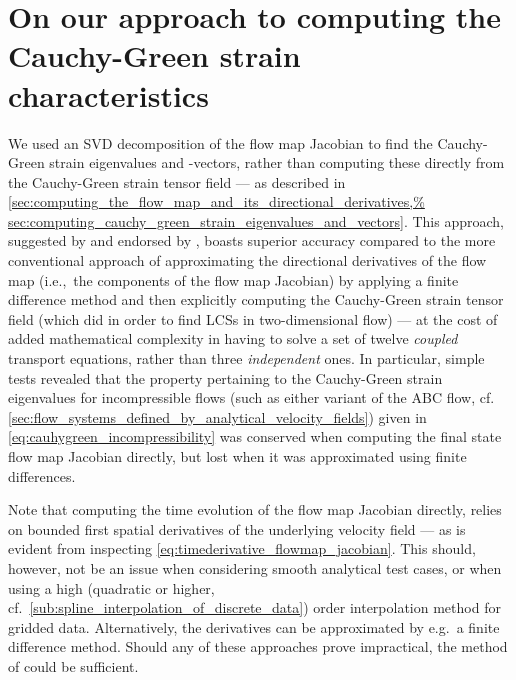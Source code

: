 \section[On our approach to computing the Cauchy-Green
strain characteristics] {On our approach to computing the%
    \\\phantom{5.1} Cauchy-Green strain characteristics}
\label{sec:on_our_approach_to_computing_the_cauchy_green%
_strain_characteristics}

We used an SVD decomposition of the flow map Jacobian to find the Cauchy-Green
strain eigenvalues and -vectors, rather than computing these directly from the
Cauchy-Green strain tensor field --- as described in
\cref{sec:computing_the_flow_map_and_its_directional_derivatives,%
sec:computing_cauchy_green_strain_eigenvalues_and_vectors}. This approach,
suggested by \textcite{miron2012anisotropic} and endorsed by
\textcite{oettinger2016autonomous}, boasts superior accuracy compared to the
more conventional approach of approximating the directional derivatives of the
flow map (i.e.,\ the components of the flow map Jacobian) by applying a finite
difference method and then explicitly computing the Cauchy-Green strain
tensor field (which \textcite{farazmand2012computing} did in order to find LCSs
in two-dimensional flow) --- at the cost of added mathematical complexity in
having to solve a set of twelve \emph{coupled} transport equations, rather than
three \emph{independent} ones. In particular, simple tests revealed that the
property pertaining to the Cauchy-Green strain eigenvalues for incompressible
flows (such as either variant of the ABC flow, cf.\ %
\cref{sec:flow_systems_defined_by_analytical_velocity_fields}) given in
\cref{eq:cauhygreen_incompressibility} was conserved when computing the final
state flow map Jacobian directly, but lost when it was approximated using
finite differences.

Note that computing the time evolution of the flow map Jacobian directly,
relies on bounded first spatial derivatives of the underlying velocity field
--- as is evident from inspecting \cref{eq:timederivative_flowmap_jacobian}.
This should, however, not be an issue when considering smooth analytical test
cases, or when using a high (quadratic or higher, cf.\
\cref{sub:spline_interpolation_of_discrete_data}) order interpolation method
for gridded data. Alternatively, the derivatives can be approximated by e.g.\
a finite difference method. Should any of these approaches prove impractical,
the method of \textcite{farazmand2012computing} could be sufficient.

